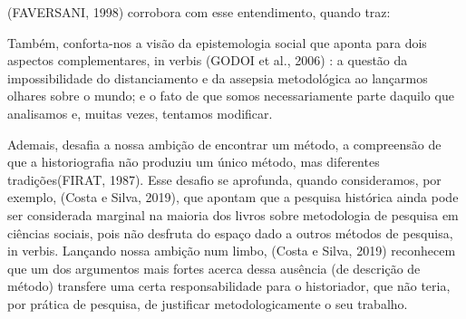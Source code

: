 \documentclass[
12pt,		%
openright,	%
twoside,  %
a4paper,			%
chapter=TITLE,		%
english,			%
french,				%
spanish,			%
brazil				%
]{USPSC-classe/USPSC}
\begin{document}
(FAVERSANI, 1998) corrobora com esse entendimento, quando traz:










\noindent\begin{center}\mbox{\centering{}}\end{center}


Tamb\'em, conforta-nos a vis\~ao da epistemologia social que aponta para dois aspectos complementares, in verbis (GODOI et al., 2006) : \textquotedbl a quest\~ao da impossibilidade do distanciamento e da assepsia metodol\'ogica ao lan\c{c}armos olhares sobre o mundo; e o fato de que somos necessariamente parte daquilo que analisamos e, muitas vezes, tentamos modificar\textquotedbl .









Ademais, desafia a nossa ambi\c{c}\~ao de \textquotedbl encontrar um m\'etodo\textquotedbl , a compreens\~ao de que a \textquotedbl historiografia n\~ao produziu um \'unico m\'etodo, mas diferentes tradi\c{c}\~oes\textquotedbl  (FIRAT, 1987).  Esse desafio se aprofunda, quando consideramos, por exemplo, (Costa e Silva, 2019), que apontam que a \textquotedbl pesquisa hist\'orica ainda pode ser considerada marginal na maioria dos livros sobre metodologia de pesquisa em ci\^encias sociais, pois n\~ao desfruta do espa\c{c}o dado a outros m\'etodos de pesquisa\textquotedbl , in verbis. Lan\c{c}ando nossa ambi\c{c}\~ao num limbo,  (Costa e Silva, 2019) reconhecem \textquotedbl que um dos argumentos mais fortes acerca dessa aus\^encia (de descri\c{c}\~ao de m\'etodo) transfere uma certa responsabilidade para o historiador, que n\~ao teria, por pr\'atica de pesquisa, de justificar metodologicamente o seu trabalho\textquotedbl .
\end{document}
